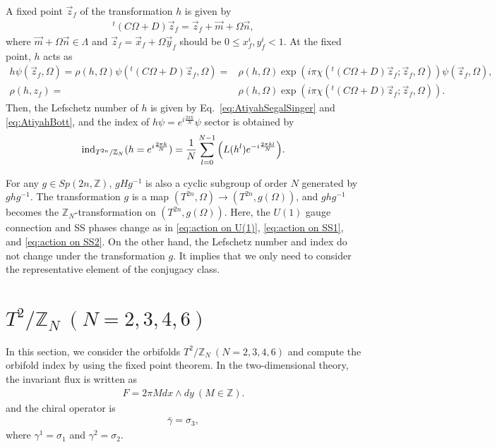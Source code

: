 \documentclass[11pt]{article}
\newcommand{\Lef}{Lefschetz }
\begin{document}
A fixed point $\vec{z}_f$ of the transformation $h$ is given by
\begin{align}
    {}^t ( C\Omega + D) \vec{z}_f= \vec{z}_f+ \vec{m}+\Omega \vec{n},
\end{align}
where $\vec{m}+\Omega \vec{n} \in \Lambda$ and $\vec{z}_f = \vec{x}_f+\Omega \vec{y}_f$ should be $0\leq x_f^i,y_f^i <1$. At the fixed point, $h$ acts as
\begin{align}
    h\psi(\vec{z}_f,\Omega)= \rho(h,\Omega) \psi( {}^t ( C\Omega + D)\vec{z}_f, \Omega )= & \rho(h,\Omega) \exp(i\pi \chi( {}^t ( C\Omega + D)\vec{z}_f ;\vec{z}_f,\Omega)) \psi(\vec{z}_f,\Omega),\\
    \rho(h,z_f)= & \rho(h,\Omega) \exp(i\pi \chi( {}^t ( C\Omega + D)\vec{z}_f ;\vec{z}_f,\Omega)) .
\end{align}
Then, the \Lef number of $h$ is given by Eq.~\eqref{eq:AtiyahSegalSinger} and \eqref{eq:AtiyahBott}, and the index of $h\psi= e^{i\frac{2\pi k}{N}} \psi$ sector is obtained by
\begin{align}
    \text{ind}_{T^{2n}/\mathbb{Z}_N}(h= e^{i\frac{2\pi k}{N}})= \frac{1}{N}\sum_{l=0}^{N-1} \qty( L(h^l)  e^{-i\frac{2\pi kl}{N}} )  \label{eq:formula_of_index}. 
\end{align}

For any $g \in Sp(2n, \mathbb{Z})$, $gHg^{-1}$ is also a cyclic subgroup of order $N$ generated by $g h g^{-1}$. The transformation $g$ is a map $(T^{2n}, \Omega)\to (T^{2n}, g(\Omega))$, and  $g h g^{-1}$ becomes the $\mathbb{Z}_N$-transformation on $(T^{2n}, g(\Omega))$. Here, the $U(1)$ gauge connection and SS phases change as in \eqref{eq:action on U(1)}, \eqref{eq:action on SS1}, and \eqref{eq:action on SS2}. On the other hand, the \Lef number and index do not change under the transformation $g$. It implies that we only need to consider the representative element of the conjugacy class.

\section{$T^2/\mathbb{Z}_N~(N=2,3,4,6)$}
\label{T2ZN}
In this section, we consider the orbifolds $T^2/\mathbb{Z}_N~(N=2,3,4,6)$ and compute the orbifold index by using the fixed point theorem. In the two-dimensional theory, the invariant flux is written as
\begin{align}
    F=2\pi M dx \wedge dy~(M\in \mathbb{Z}).
\end{align}
and the chiral operator is
\begin{align}
    \bar{\gamma}=\sigma_3,
\end{align}
where $\gamma^1=\sigma_1$ and $\gamma^2=\sigma_2$.
\end{document}
